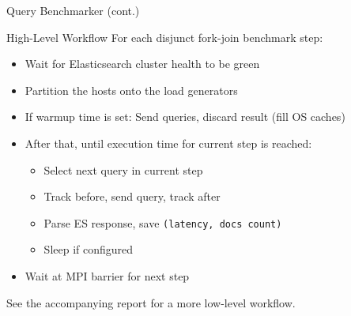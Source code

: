 \documentclass[compress,aspectratio=169]{beamer}
\begin{document}
  \begin{frame}[fragile]{}
    \begin{tcolorbox}[title=Input Format for Query Benchmarker (part 1)]
    \footnotesize\inputminted[xleftmargin=1em,linenos]{text}{./assets/queryinput.json}
    \end{tcolorbox}
  \end{frame}
  \begin{frame}[fragile]{}
    \begin{tcolorbox}[title=Input Format for Query Benchmarker (part 2)]
    \footnotesize\inputminted[xleftmargin=1em,linenos]{text}{./assets/queryinput2.json}
    \end{tcolorbox}
  \end{frame}

  \begin{frame}{Query Benchmarker (cont.)}
    \begin{block}{High-Level Workflow}
      For each disjunct fork-join benchmark step:
      \pause
      \begin{itemize}
        \item Wait for Elasticsearch cluster health to be green
          \pause
        \item Partition the hosts onto the load generators
          \pause
        \item If warmup time is set: Send queries, discard result (fill OS caches)
          \pause
        \item After that, until execution time for current step is reached:
          \begin{itemize}
            \item Select next query in current step
          \pause
            \item Track before, send query, track after
          \pause
            \item Parse ES response, save \texttt{(latency, docs count)}
          \pause
            \item Sleep if configured
          \end{itemize}
          \pause
        \item Wait at MPI barrier for next step
      \end{itemize}
    \end{block}
          \pause
    \vspace*{-0.5cm}
    \begin{center}
      See the accompanying report for a more low-level workflow.
    \end{center}
  \end{frame}
\end{document}
